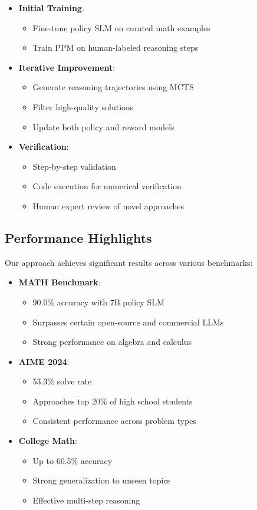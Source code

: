 \begin{itemize}
    \item \textbf{Initial Training}:
    \begin{itemize}
        \item Fine-tune policy SLM on curated math examples
        \item Train PPM on human-labeled reasoning steps
    \end{itemize}
    \item \textbf{Iterative Improvement}:
    \begin{itemize}
        \item Generate reasoning trajectories using MCTS
        \item Filter high-quality solutions
        \item Update both policy and reward models
    \end{itemize}
    \item \textbf{Verification}:
    \begin{itemize}
        \item Step-by-step validation
        \item Code execution for numerical verification
        \item Human expert review of novel approaches
    \end{itemize}
\end{itemize}

\subsection{Performance Highlights}

Our approach achieves significant results across various benchmarks:

\begin{itemize}
    \item \textbf{MATH Benchmark}:
    \begin{itemize}
        \item 90.0\% accuracy with 7B policy SLM
        \item Surpasses certain open-source and commercial LLMs
        \item Strong performance on algebra and calculus
    \end{itemize}
    \item \textbf{AIME 2024}:
    \begin{itemize}
        \item 53.3\% solve rate
        \item Approaches top 20\% of high school students
        \item Consistent performance across problem types
    \end{itemize}
    \item \textbf{College Math}:
    \begin{itemize}
        \item Up to 60.5\% accuracy
        \item Strong generalization to unseen topics
        \item Effective multi-step reasoning
    \end{itemize}
\end{itemize}

